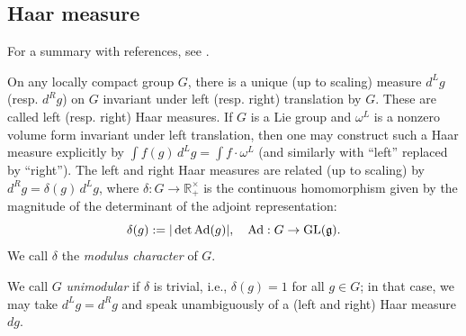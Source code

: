 \documentclass[reqno]{amsart} 
\begin{document}



\subsection{Haar measure}
\label{sec:org2326c58}
For a summary with references, see \cite[\S2.9]{MR1482800}.


On any locally compact group $G$, there is a unique (up to scaling) measure $d^L g$ (resp. $d^R g$) on $G$ invariant under left (resp. right) translation by $G$.  These are called left (resp. right) Haar measures.  If $G$ is a Lie group and $\omega^L$ is a nonzero volume form invariant under left translation, then one may construct such a Haar measure explicitly by $\int f (g) \, d ^L g = \int f \cdot \omega^L$ (and similarly with ``left'' replaced by ``right'').  The left and right Haar measures are related (up to scaling) by $d^R g = \delta(g) \, d^L g$, where $\delta : G \rightarrow \mathbb{R}^\times_+$ is the continuous homomorphism given by the magnitude of the determinant of the adjoint representation:
\begin{equation*}
  \delta(g) := |\det \operatorname{Ad}(g)|, \quad \operatorname{Ad} : G \rightarrow
  \operatorname{GL}(\mathfrak{g}).
\end{equation*}
We call $\delta$ the \emph{modulus character} of $G$.

We call $G$ \emph{unimodular} if $\delta$ is trivial, i.e., $\delta(g) = 1$ for all $g \in G$; in that case, we may take $d^L g = d^R g$ and speak unambiguously of a (left and right) Haar measure $d g$.
\end{document}
